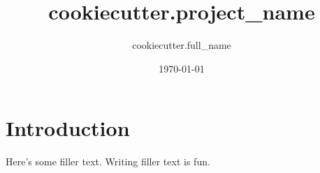 \documentclass[]{IEEEtran}
\title{ {{cookiecutter.project_name}} }
\author{ {{cookiecutter.full_name}} }
\date{\today}
\begin{document}
\maketitle

\section{Introduction}

Here's some filler text. Writing filler text is fun.
\end{document}
